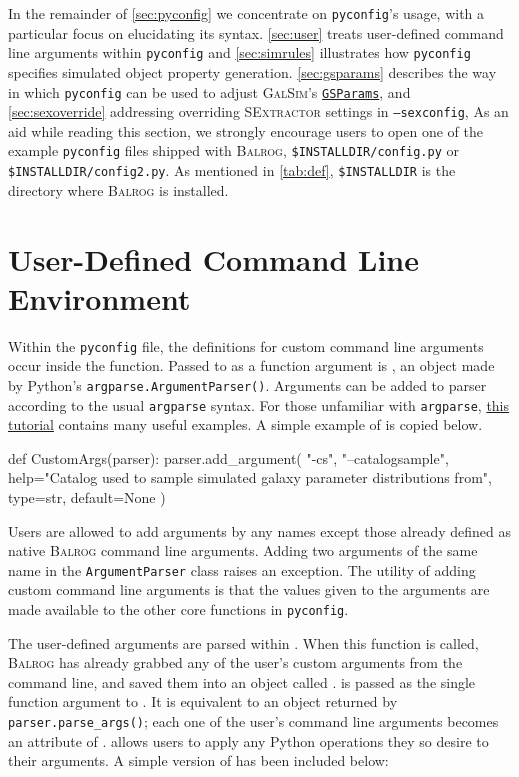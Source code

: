 \documentclass[11pt]{book}
\newcommand{\codett}[1]{\texttt{#1}}
\newcommand{\py}{Python}
\newcommand{\pyconfig}{\codett{pyconfig}}
\newcommand{\galsim}{\textsc{GalSim}}
\newcommand{\balrog}{\textsc{Balrog}}
\newcommand{\sex}{\textsc{SExtractor}}
\newcommand{\opt}[1]{\codett{--#1}}
\begin{document}
In the remainder of \autoref{sec:pyconfig} we concentrate on \pyconfig{}'s usage, with a particular focus on elucidating its syntax.
\autoref{sec:user} treats user-defined command line arguments within \pyconfig{} and 
\autoref{sec:simrules} illustrates how \pyconfig{} specifies simulated object property generation.
\autoref{sec:gsparams} describes the way in which \pyconfig{} can be used to 
adjust \galsim{}'s \href{http://galsim-developers.github.io/GalSim/structgalsim\_1\_1\_g\_s\_params.html}{\texttt{GSParams}},
and \autoref{sec:sexoverride} addressing overriding \sex{} settings in \opt{sexconfig},
As an aid while reading this section, 
we strongly encourage users to open one of the example \pyconfig{} files shipped with \balrog{},
\codett{\$INSTALLDIR/config.py} or \codett{\$INSTALLDIR/config2.py}.
As mentioned in \autoref{tab:def}, \codett{\$INSTALLDIR} is the directory where \balrog{} is installed.

\section{User-Defined Command Line Environment}
\label{sec:user}

Within the \pyconfig{} file, the definitions for custom command line arguments occur inside the \argsfunc{} function.
Passed to \argsfunc{}  as a function argument is \argsparser{},
an object made by \py{}'s
\codett{argparse.ArgumentParser()}. Arguments
can be added to parser according to the usual
\codett{argparse} syntax.
For those unfamiliar with \codett{argparse},
\href{http://docs.python.org/2/howto/argparse.html}{this tutorial}
contains many useful examples. A simple example of
\argsfunc{} is copied below.

\begin{code}
def CustomArgs(parser):
    parser.add_argument( "-cs", "--catalogsample", help="Catalog used to sample simulated galaxy parameter distributions from", type=str, default=None )
\end{code}

\noindent Users are allowed to add arguments by any names except those already defined as native \balrog{} command line arguments.
Adding two arguments of the same name in the \codett{ArgumentParser} class raises an exception.
The utility of adding custom command line arguments is that the values given to the arguments
are made available to the other core functions in \pyconfig{}.

The user-defined arguments are parsed within \parsefunc{}.
When this function is called, 
\balrog{} has already grabbed any of the user's custom arguments from the command line,
and saved them into an object called \parseargs{}.
\parseargs{} is passed as the single function argument to \parsefunc{}.
It is equivalent to an object returned by \codett{parser.parse\_args()};
each one of the user's command line arguments becomes an attribute of \parseargs{}. 
\parsefunc{} allows users to apply any \py{} operations they so desire to their arguments.
A simple version of \parsefunc{} has been included below:
\end{document}
